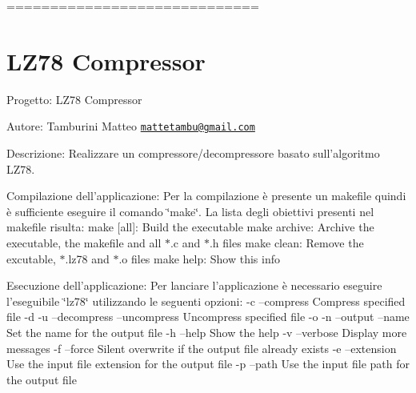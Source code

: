 ============================= \section*{L\-Z78 Compressor}

Progetto\-: L\-Z78 Compressor

Autore\-: Tamburini Matteo \href{mailto:mattetambu@gmail.com}{\tt mattetambu@gmail.\-com}

Descrizione\-: Realizzare un compressore/decompressore basato sull'algoritmo L\-Z78.

Compilazione dell'applicazione\-: Per la compilazione è presente un makefile quindi è sufficiente eseguire il comando \char`\"{}make\char`\"{}. La lista degli obiettivi presenti nel makefile risulta\-: make \mbox{[}all\mbox{]}\-: Build the executable make archive\-: Archive the executable, the makefile and all $\ast$.c and $\ast$.h files make clean\-: Remove the excutable, $\ast$.lz78 and $\ast$.o files make help\-: Show this info

Esecuzione dell'applicazione\-: Per lanciare l'applicazione è necessario eseguire l'eseguibile \char`\"{}lz78\char`\"{} utilizzando le seguenti opzioni\-: -\/c --compress Compress specified file -\/d -\/u --decompress --uncompress Uncompress specified file -\/o -\/n --output --name Set the name for the output file -\/h --help Show the help -\/v --verbose Display more messages -\/f --force Silent overwrite if the output file already exists -\/e --extension Use the input file extension for the output file -\/p --path Use the input file path for the output file 